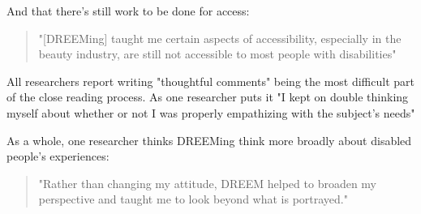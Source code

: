 And that there's still work to be done for access: 
\begin{quote}
    "[DREEMing] taught me certain aspects of accessibility, especially in the beauty industry, are still not accessible to most people with disabilities"
\end{quote}
  
All researchers report writing "thoughtful comments" being the most difficult part of the close reading process. As one researcher puts it "I kept on double thinking myself about whether or not I was properly empathizing with the subject's needs" 

As a whole, one researcher thinks DREEMing think more broadly about disabled people's experiences:
\begin{quote}
        "Rather than changing my attitude, DREEM helped to broaden my perspective and taught me to look beyond what is portrayed."
\end{quote}
  











